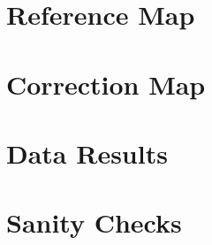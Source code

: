 \documentclass[a4paper,11pt]{article}
\begin{document}
\section{Reference Map}
\label{sec:refmap}

\pagebreak
\section{Correction Map}
\label{sec:corrmap}

\pagebreak
\section{Data Results}
\label{sec:dataresults}

\pagebreak
\section{Sanity Checks}
\label{sec:sanchecks}
\end{document}
